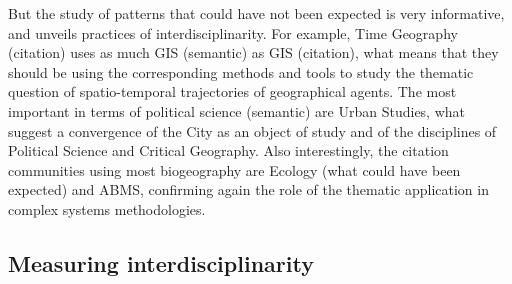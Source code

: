 But the study of patterns that could have not been expected is very informative, and unveils practices of interdisciplinarity. For example, Time Geography (citation) uses as much GIS (semantic) as GIS (citation), what means that they should be using the corresponding methods and tools to study the thematic question of spatio-temporal trajectories of geographical agents. The most important in terms of political science (semantic) are Urban Studies, what suggest a convergence of the City as an object of study and of the disciplines of Political Science and Critical Geography. Also interestingly, the citation communities using most biogeography are Ecology (what could have been expected) and ABMS, confirming again the role of the thematic application in complex systems methodologies.





\subsection*{Measuring interdisciplinarity}
\label{subsec:interdisc}


